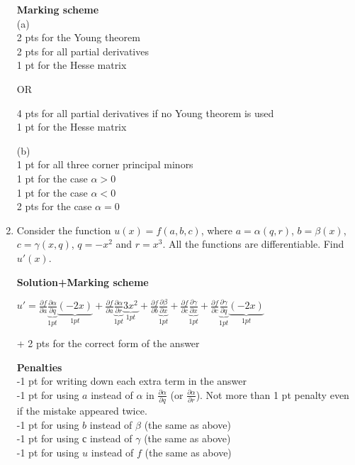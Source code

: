 \begin{enumerate}
  \textbf{Marking scheme}\\
  (a)\\
  2 pts for the Young theorem\\
  2 pts for all partial derivatives\\
  1 pt for the Hesse matrix

  OR

  4 pts for all partial derivatives if no Young theorem is used\\
  1 pt for the Hesse matrix

  (b)\\
  1 pt for all three corner principal minors\\
  1 pt for the case $\alpha > 0$\\
  1 pt for the case $\alpha <0$\\
  2 pts for the case $\alpha =0$


  \item

  Consider the function $u(x)=f(a,b,c)$, where $a=\alpha(q,r)$, $b=\beta(x)$, $c=\gamma(x,q)$, $q=-x^2$ and $r=x^3$. All the functions are differentiable. Find $u'(x)$.

  \textbf{Solution+Marking scheme}

  $\displaystyle
  u'=\frac{\partial f}{\partial a}\underbrace{\frac{\partial \alpha}{\partial q}}_{1 pt}\underbrace{(-2x)}_{1 pt}+\frac{\partial f}{\partial a}\underbrace{\frac{\partial \alpha}{\partial r}}_{1 pt}\underbrace{3x^2}_{1 pt}+\frac{\partial f}{\partial b}\underbrace{\frac{\partial \beta}{\partial x}}_{1 pt}+\frac{\partial f}{\partial c}\underbrace{\frac{\partial \gamma}{\partial x}}_{1 pt}+\frac{\partial f}{\partial c}\underbrace{\frac{\partial\gamma}{\partial q}}_{1 pt}\underbrace{(-2x)}_{1 pt}$

  + 2 pts for the correct form of the answer

  \textbf{Penalties}\\
  -1 pt for writing down each extra term in the answer\\
  -1 pt for using $a$ instead of $\alpha$ in $\frac{\partial \alpha}{\partial q}$ (or $\frac{\partial \alpha}{\partial r}$). Not more than 1 pt penalty even if the mistake appeared twice.\\
  -1 pt for using $b$ instead of $\beta$ (the same as above)\\
  -1 pt for using $с$ instead of $\gamma$ (the same as above)\\
  -1 pt for using $u$ instead of $f$ (the same as above)


\end{enumerate}
